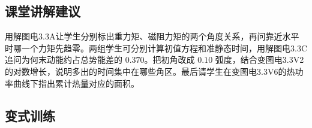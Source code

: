 \documentclass[UTF8,fontset=fandol,a4paper,11pt]{ctexart}
\begin{document}
\subsection*{课堂讲解建议}

用解图电3.3A让学生分别标出重力矩、磁阻力矩的两个角度关系，再问靠近水平时哪一个力矩先趋零。两组学生可分别计算初值方程和准静态时间，用解图电3.3C追问为何末动能约占总势能差的 $0.370$。把初角改成 $0.10$ 弧度，结合变图电3.3V2的对数增长，说明多出的时间集中在哪些角区。最后请学生在变图电3.3V6的热功率曲线下指出累计热量对应的面积。


\subsection*{变式训练}
\end{document}
